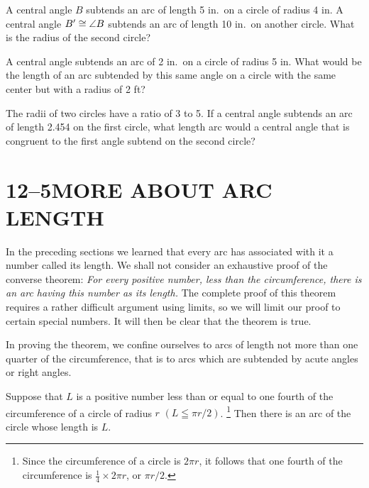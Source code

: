 \documentclass[11pt]{book}
\newcommand{\XIIsymfoot}[1]{%
  \begingroup
  \renewcommand{\thefootnote}{\fnsymbol{footnote}}%
  \setcounter{footnote}{0}%
  \footnote{#1}%
  \endgroup}
\begin{document}
\begin{exercisecols}
\begin{exlist}
\item A central angle $B$ subtends an arc of length 5 in.\ on a circle of radius
      4 in. A central angle $B' \cong \angle B$ subtends an arc of length 10 in.\
      on another circle. What is the radius of the second circle?
\item A central angle subtends an arc of 2 in.\ on a circle of radius 5 in. What
      would be the length of an arc subtended by this same angle on a circle
      with the same center but with a radius of 2 ft?
\item The radii of two circles have a ratio of 3 to 5. If a central angle
      subtends an arc of length 2.454 on the first circle, what length arc would
      a central angle that is congruent to the first angle subtend on the second
      circle?
\end{exlist}
\end{exercisecols}

\section*{12--5\quad MORE ABOUT ARC LENGTH}

In the preceding sections we learned that every arc has associated with it a
number called its length. We shall not consider an exhaustive proof of the
converse theorem: \emph{For every positive number, less than the circumference,
there is an arc having this number as its length.} The complete proof of this
theorem requires a rather difficult argument using limits, so we will limit our
proof to certain special numbers. It will then be clear that the theorem is
true.

In proving the theorem, we confine ourselves to arcs of length not more than one
quarter of the circumference, that is to arcs which are subtended by acute
angles or right angles.

\begin{theorem}
Suppose that $L$ is a positive number less than or equal to one fourth of the
circumference of a circle of radius $r$ $(L \leqq \pi r/2)$.\XIIsymfoot{Since
the circumference of a circle is $2\pi r$, it follows that one fourth of the
circumference is $\frac{1}{4} \times 2\pi r$, or $\pi r/2$.} Then there is an
arc of the circle whose length is $L$.
\end{theorem}
\end{document}
